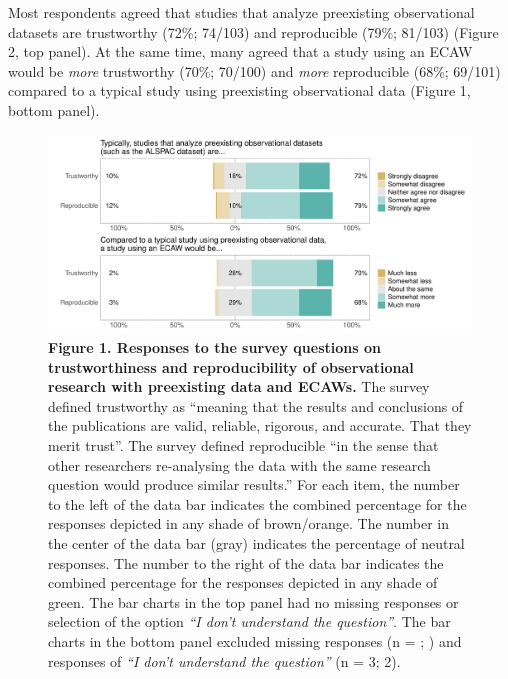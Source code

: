 \documentclass[
  man,floatsintext]{apa6}
\begin{document}
Most respondents agreed that studies that analyze preexisting observational datasets are trustworthy (72\%; 74/103) and reproducible (79\%; 81/103) (Figure 2, top panel). At the same time, many agreed that a study using an ECAW would be \emph{more} trustworthy (70\%; 70/100) and \emph{more} reproducible (68\%; 69/101) compared to a typical study using preexisting observational data (Figure 1, bottom panel).

\begin{figure}

{\centering \includegraphics[width=1\linewidth]{figs/typicallyEcawPlot-1} 

}

\caption{\textbf{Figure 1. Responses to the survey questions on trustworthiness and reproducibility of observational research with preexisting data and ECAWs.} The survey defined trustworthy as ``meaning that the results and conclusions of the publications are valid, reliable, rigorous, and accurate. That they merit trust''. The survey defined reproducible ``in the sense that other researchers re-analysing the data with the same research question would produce similar results.'' For each item, the number to the left of the data bar indicates the combined percentage for the responses depicted in any shade of brown/orange. The number in the center of the data bar (gray) indicates the percentage of neutral responses. The number to the right of the data bar indicates the combined percentage for the responses depicted in any shade of green. The bar charts in the top panel had no missing responses or selection of the option \emph{``I don't understand the question''}. The bar charts in the bottom panel excluded missing responses (n = ; ) and responses of \emph{``I don't understand the question''} (n = 3; 2).}\label{fig:typicallyEcawPlot}
\end{figure}
\end{document}
